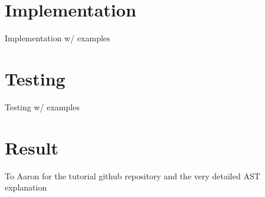 \documentclass[sigplan,screen]{acmart}
\begin{document}
\section{Implementation}
    Implementation w/ examples

\section{Testing}
    Testing w/ examples
    
\section{Result}


\begin{acks}
    To Aaron for the tutorial github repository and the very detailed AST explanation
\end{acks}



\end{document}
